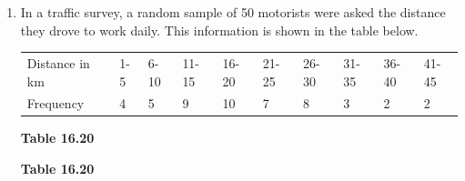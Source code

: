 \begin{description}[noitemsep]
\begin{description}[noitemsep]
\begin{enumerate}[noitemsep, label=\textbf{\arabic*}. ]
  \label{m39404*id217711}\begin{enumerate}[noitemsep, label=\textbf{\alph*}. ] 
            \label{m39404*uid137}\item Set up a frequency table using 6 intervals.
\label{m39404*uid138}\item Calculate the approximate mean.
\label{m39404*uid139}\item Determine the mode.
\label{m39404*uid140}\item How many learners are taller than your approximate average in (b)?
\end{enumerate}
                \label{m39404*uid141}\item In a traffic survey, a random sample of 50 motorists were asked the distance they drove to work daily. This information is shown in the table below.
          \begin{table}
        \begin{center}
      \label{m39404*id217778}
    \noindent
      \tablelasttail{}
      \begin{xtabular}[t]{|l|l|l|l|l|l|l|l|l|l|}\hline
        Distance in km &
        1-5 &
        6-10 &
        11-15 &
        16-20 &
        21-25 &
        26-30 &
        31-35 &
        36-40 &
        41-45%
     \tabularnewline{}
        Frequency &
        4 &
        5 &
        9 &
        10 &
        7 &
        8 &
        3 &
        2 &
        2%
     \tabularnewline{}
    \end{xtabular}
      \end{center}
    \begin{center}{\small\bfseries Table 16.20}\end{center}
    \begin{caption}{\small\bfseries Table 16.20}\end{caption}

\end{table}
\end{enumerate}
\end{description}
\end{description}

